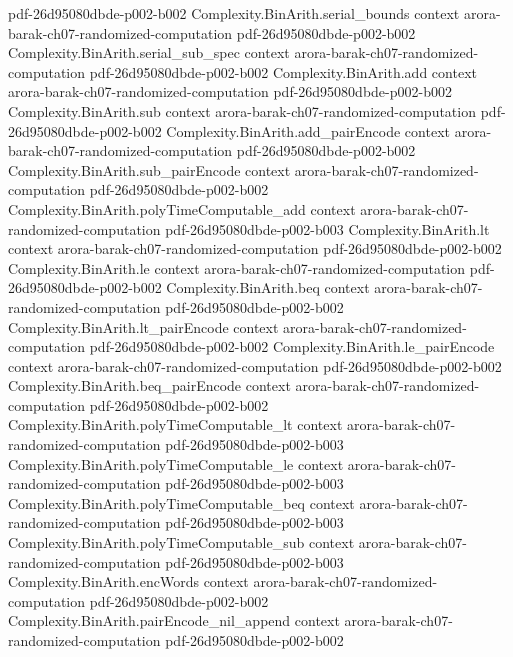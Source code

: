\begin{theorem}
  {pdf-26d95080dbde-p002-b002}
\proofstep
  {Complexity.BinArith.serial_bounds}
  {context}
  {arora-barak-ch07-randomized-computation}
  {pdf-26d95080dbde-p002-b002}
\proofstep
  {Complexity.BinArith.serial_sub_spec}
  {context}
  {arora-barak-ch07-randomized-computation}
  {pdf-26d95080dbde-p002-b002}
\proofstep
  {Complexity.BinArith.add}
  {context}
  {arora-barak-ch07-randomized-computation}
  {pdf-26d95080dbde-p002-b002}
\proofstep
  {Complexity.BinArith.sub}
  {context}
  {arora-barak-ch07-randomized-computation}
  {pdf-26d95080dbde-p002-b002}
\proofstep
  {Complexity.BinArith.add_pairEncode}
  {context}
  {arora-barak-ch07-randomized-computation}
  {pdf-26d95080dbde-p002-b002}
\proofstep
  {Complexity.BinArith.sub_pairEncode}
  {context}
  {arora-barak-ch07-randomized-computation}
  {pdf-26d95080dbde-p002-b002}
\proofstep
  {Complexity.BinArith.polyTimeComputable_add}
  {context}
  {arora-barak-ch07-randomized-computation}
  {pdf-26d95080dbde-p002-b003}
\proofstep
  {Complexity.BinArith.lt}
  {context}
  {arora-barak-ch07-randomized-computation}
  {pdf-26d95080dbde-p002-b002}
\proofstep
  {Complexity.BinArith.le}
  {context}
  {arora-barak-ch07-randomized-computation}
  {pdf-26d95080dbde-p002-b002}
\proofstep
  {Complexity.BinArith.beq}
  {context}
  {arora-barak-ch07-randomized-computation}
  {pdf-26d95080dbde-p002-b002}
\proofstep
  {Complexity.BinArith.lt_pairEncode}
  {context}
  {arora-barak-ch07-randomized-computation}
  {pdf-26d95080dbde-p002-b002}
\proofstep
  {Complexity.BinArith.le_pairEncode}
  {context}
  {arora-barak-ch07-randomized-computation}
  {pdf-26d95080dbde-p002-b002}
\proofstep
  {Complexity.BinArith.beq_pairEncode}
  {context}
  {arora-barak-ch07-randomized-computation}
  {pdf-26d95080dbde-p002-b002}
\proofstep
  {Complexity.BinArith.polyTimeComputable_lt}
  {context}
  {arora-barak-ch07-randomized-computation}
  {pdf-26d95080dbde-p002-b003}
\proofstep
  {Complexity.BinArith.polyTimeComputable_le}
  {context}
  {arora-barak-ch07-randomized-computation}
  {pdf-26d95080dbde-p002-b003}
\proofstep
  {Complexity.BinArith.polyTimeComputable_beq}
  {context}
  {arora-barak-ch07-randomized-computation}
  {pdf-26d95080dbde-p002-b003}
\proofstep
  {Complexity.BinArith.polyTimeComputable_sub}
  {context}
  {arora-barak-ch07-randomized-computation}
  {pdf-26d95080dbde-p002-b003}
\proofstep
  {Complexity.BinArith.encWords}
  {context}
  {arora-barak-ch07-randomized-computation}
  {pdf-26d95080dbde-p002-b002}
\proofstep
  {Complexity.BinArith.pairEncode_nil_append}
  {context}
  {arora-barak-ch07-randomized-computation}
  {pdf-26d95080dbde-p002-b002}

\end{theorem}
